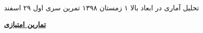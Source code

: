 \documentclass{article}
\begin{document}
\handout
{{تحلیل آماری در ابعاد بالا}}
{۱}
{زمستان ۱۳۹۸}
{تمرین سری اول}
{۲۹  اسفند}

\vspace{0.5cm}














\newpage
\vspace{1cm}\Large\underline{\textbf{تمارین امتیازی}}\normalsize







\end{document}
